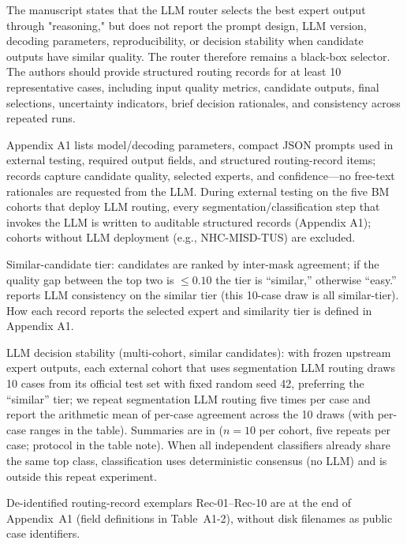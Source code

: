\label{rev:R2.9}
\begin{reviewercomment}
The manuscript states that the LLM router selects the best expert output through "reasoning," but does not report the prompt design, LLM version, decoding parameters, reproducibility, or decision stability when candidate outputs have similar quality. The router therefore remains a black-box selector. The authors should provide structured routing records for at least 10 representative cases, including input quality metrics, candidate outputs, final selections, uncertainty indicators, brief decision rationales, and consistency across repeated runs.
\end{reviewercomment}
\begin{authorresponse}
Appendix A1 lists model/decoding parameters, compact JSON prompts used in external testing, required output fields, and structured routing-record items; records capture candidate quality, selected experts, and confidence---no free-text rationales are requested from the LLM. During external testing on the five BM cohorts that deploy LLM routing, every segmentation/classification step that invokes the LLM is written to auditable structured records (Appendix A1); cohorts without LLM deployment (e.g., NHC-MISD-TUS) are excluded.\par
Similar-candidate tier: candidates are ranked by inter-mask agreement; if the quality gap between the top two is $\leq 0.10$ the tier is ``similar,'' otherwise ``easy.''  reports LLM consistency on the similar tier (this 10-case draw is all similar-tier). How each record reports the selected expert and similarity tier is defined in Appendix A1.\par
LLM decision stability (multi-cohort, similar candidates): with frozen upstream expert outputs, each external cohort that uses segmentation LLM routing draws 10 cases from its official test set with fixed random seed 42, preferring the ``similar'' tier; we repeat segmentation LLM routing five times per case and report the arithmetic mean of per-case agreement across the 10 draws (with per-case ranges in the table). Summaries are in  ($n{=}10$ per cohort, five repeats per case; protocol in the table note). When all independent classifiers already share the same top class, classification uses deterministic consensus (no LLM) and is outside this repeat experiment.\par
De-identified routing-record exemplars Rec-01--Rec-10 are at the end of Appendix~A1 (field definitions in Table~A1-2), without disk filenames as public case identifiers.\par
\par
\end{authorresponse}

